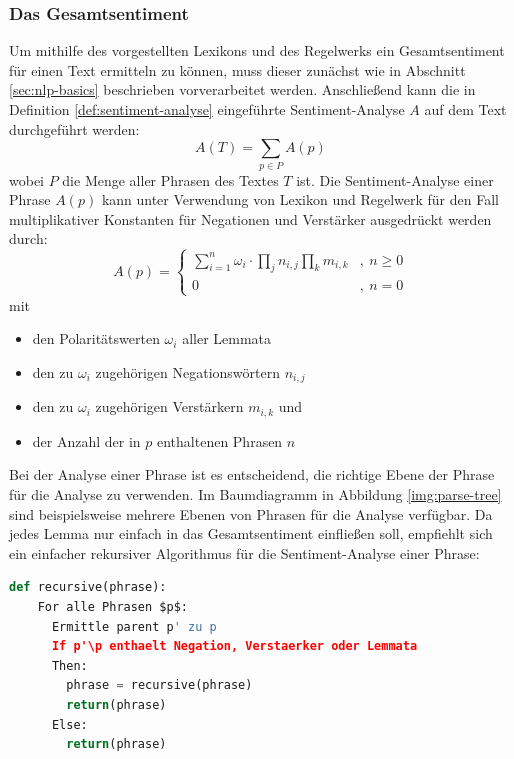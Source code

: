 \documentclass[
	a4paper,
	12pt,
	bibliography=totocnumbered,
	twoside,
]{scrreprt}
\begin{document}
\subsubsection*{Das Gesamtsentiment}


Um mithilfe des vorgestellten Lexikons und des Regelwerks ein Gesamtsentiment für einen Text ermitteln zu können, muss dieser zunächst wie in Abschnitt \ref{sec:nlp-basics} beschrieben vorverarbeitet werden. Anschließend kann die in Definition \ref{def:sentiment-analyse} eingeführte Sentiment-Analyse $A$ auf dem Text durchgeführt werden:\begin{equation}
    A(T) = \sum_{p \in P} A(p)
\end{equation}
wobei $P$ die Menge aller Phrasen des Textes $T$ ist. Die Sentiment-Analyse einer Phrase $A(p)$ kann unter Verwendung von Lexikon und Regelwerk für den Fall multiplikativer Konstanten für Negationen und Verstärker ausgedrückt werden durch:\begin{equation}
    A(p) =\begin{cases}
                        \sum_{i=1}^{n} \omega_i \cdot \prod_{j} n_{i,j} \prod_{k} m_{i,k}   & , \ n \geq 0 \\
                        0 & , \ n = 0
                    \end{cases}
\end{equation}
mit
\begin{itemize}
	  \setlength\itemsep{0.1em}
    \item den Polaritätswerten $\omega_i$ aller Lemmata
    \item den zu $\omega_i$ zugehörigen Negationswörtern $n_{i,j}$
    \item den zu $\omega_i$ zugehörigen Verstärkern $m_{i, k}$ und
    \item der Anzahl der in $p$ enthaltenen Phrasen $n$
\end{itemize}

Bei der Analyse einer Phrase ist es entscheidend, die richtige Ebene der Phrase für die Analyse zu verwenden. Im Baumdiagramm in Abbildung \ref{img:parse-tree} sind beispielsweise mehrere Ebenen von Phrasen für die Analyse verfügbar. Da jedes Lemma nur einfach in das Gesamtsentiment einfließen soll, empfiehlt sich ein einfacher rekursiver Algorithmus für die Sentiment-Analyse einer Phrase:


\begin{lstlisting}[float, language=python, caption={Rekursiver Algorithmus zum Ermitteln der relevanten Phrasenebene}, label={lst:phrase-recursion}]
    def recursive(phrase):
    For alle Phrasen $p$:
      Ermittle parent p' zu p
      If p'\p enthaelt Negation, Verstaerker oder Lemmata
      Then:
        phrase = recursive(phrase)
        return(phrase)
      Else:
        return(phrase)
\end{lstlisting}
\end{document}
